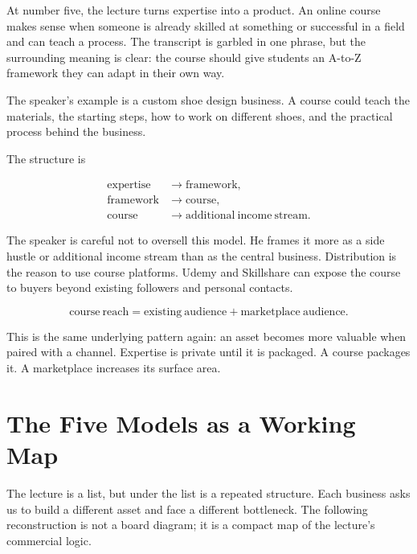 At number five, the lecture turns expertise into a product. An online course makes sense when someone is already skilled at something or successful in a field and can teach a process. The transcript is garbled in one phrase, but the surrounding meaning is clear: the course should give students an A-to-Z framework they can adapt in their own way.

The speaker's example is a custom shoe design business. A course could teach the materials, the starting steps, how to work on different shoes, and the practical process behind the business.

The structure is

\begin{align}
\mathrm{expertise}
&\longrightarrow
\mathrm{framework},\\
\mathrm{framework}
&\longrightarrow
\mathrm{course},\\
\mathrm{course}
&\longrightarrow
\mathrm{additional\ income\ stream}.
\end{align}

The speaker is careful not to oversell this model. He frames it more as a side hustle or additional income stream than as the central business. Distribution is the reason to use course platforms. Udemy and Skillshare can expose the course to buyers beyond existing followers and personal contacts.

\begin{equation}
\mathrm{course\ reach}
=
\mathrm{existing\ audience}
+
\mathrm{marketplace\ audience}.
\end{equation}

This is the same underlying pattern again: an asset becomes more valuable when paired with a channel. Expertise is private until it is packaged. A course packages it. A marketplace increases its surface area.

\section{The Five Models as a Working Map}

The lecture is a list, but under the list is a repeated structure. Each business asks us to build a different asset and face a different bottleneck. The following reconstruction is not a board diagram; it is a compact map of the lecture's commercial logic.

